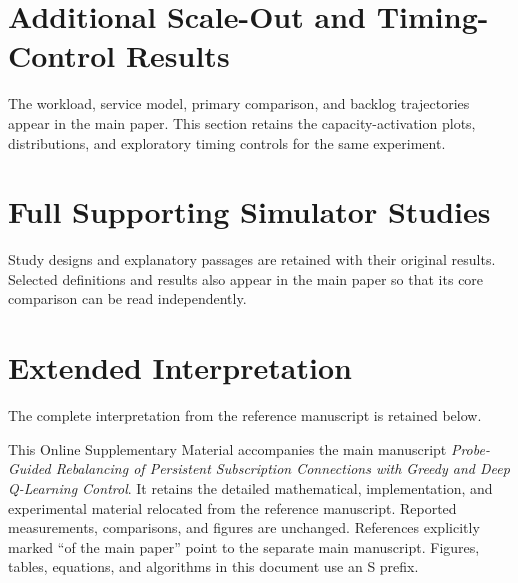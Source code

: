 \section{Additional Scale-Out and Timing-Control Results}
\label{app:scaleout-details}
The workload, service model, primary comparison, and backlog trajectories
appear in the main paper. This section retains the capacity-activation plots,
distributions, and exploratory timing controls for the same experiment.

\section{Full Supporting Simulator Studies}
\label{app:holdout-details}
Study designs and explanatory passages are retained with their original
results. Selected definitions and results also appear in the main paper so
that its core comparison can be read independently.

\section{Extended Interpretation}
The complete interpretation from the reference manuscript is retained below.

\maketitle
\raggedbottom
This Online Supplementary Material accompanies the main manuscript
\emph{Probe-Guided Rebalancing of Persistent Subscription Connections with
Greedy and Deep Q-Learning Control}. It retains the detailed mathematical,
implementation, and experimental material relocated from the reference
manuscript. Reported measurements, comparisons, and figures are unchanged.
References explicitly marked ``of the main paper'' point to the separate
main manuscript. Figures, tables, equations, and algorithms in this document
use an S prefix.
\appendix
\renewcommand{\thefigure}{S\arabic{figure}}
\renewcommand{\thetable}{S\arabic{table}}
\renewcommand{\theequation}{S\arabic{equation}}
\renewcommand{\thealgocf}{S\arabic{algocf}}
\setcounter{tocdepth}{1}
\tableofcontents
\clearpage
